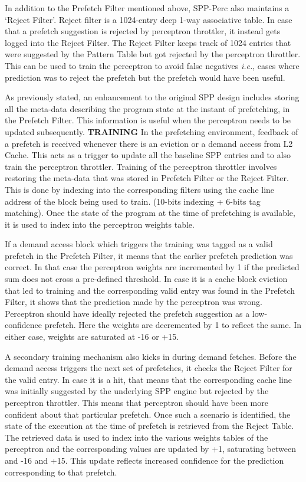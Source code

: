 \documentclass{sig-alternate}
\begin{document}
In addition to the Prefetch Filter mentioned above, SPP-Perc also maintains a `Reject Filter'. 
Reject filter is a 1024-entry deep 1-way associative table. 
In case that a prefetch suggestion is rejected by perceptron throttler, it instead gets logged into the Reject Filter. 
The Reject Filter keeps track of 1024 entries that were suggested by the Pattern Table but got rejected by the perceptron throttler. 
This can be used to train the perceptron to avoid false negatives \textit{i.e.}, cases where prediction was to reject the prefetch but the prefetch would have been useful.

As previously stated, an enhancement to the original SPP design includes storing all the meta-data describing the program state at the instant of prefetching, in the Prefetch Filter. 
This information is useful when the perceptron needs to be updated subsequently. 
\newline \newline
\textbf{TRAINING}\newline
In the prefetching environment, feedback of a prefetch is received whenever there is an eviction or a demand access from L2 Cache. 
This acts as a trigger to update all the baseline SPP entries and to also train the perceptron throttler. 
Training of the perceptron throttler involves restoring the meta-data that was stored in Prefetch Filter or the Reject Filter. 
This is done by indexing into the corresponding filters using the cache line address of the block being used to train. (10-bits indexing + 6-bits tag matching). 
Once the state of the program at the time of prefetching is available, it is used to index into the perceptron weights table. 



If a demand access block which triggers the training  was tagged as a valid prefetch in the Prefetch Filter, it means that the earlier prefetch prediction was correct. 
In that case the perceptron weights are incremented by 1 if the predicted sum does not cross a pre-defined threshold. 
 In case it is a cache block eviction that led to training and the corresponding valid entry was found in the Prefetch Filter, it shows that the prediction made by the perceptron was wrong. 
Perceptron should have ideally rejected the prefetch suggestion as a low-confidence prefetch. 
Here the weights are decremented by 1 to reflect the same. 
In either case, weights are saturated at -16 or +15.

A secondary training mechanism also kicks in during demand fetches. 
Before the demand access triggers the next set of prefetches, it checks the Reject Filter for the valid entry. 
In case it is a hit, that means that the corresponding cache line was initially suggested by the underlying SPP engine but rejected by the perceptron throttler. 
This means that perceptron should have been more confident about that particular prefetch. 
Once such a scenario is identified, the state of the execution at the time of prefetch is retrieved from the Reject Table. 
The retrieved data is used to index into the various weights tables of the perceptron and the corresponding values are updated by +1, saturating between and -16 and +15. 
This update reflects increased confidence for the prediction corresponding to that prefetch.  
\end{document}
